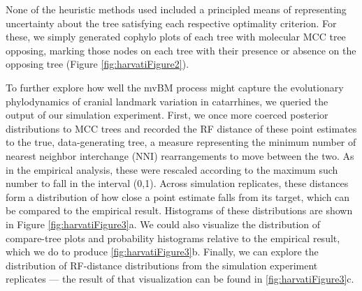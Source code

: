None of the heuristic methods used included a principled means of representing uncertainty about the tree satisfying each respective optimality criterion. For these, we simply generated cophylo plots of each tree with molecular MCC tree opposing, marking those nodes on each tree with their presence or absence on the opposing tree (Figure \ref{fig:harvatiFigure2}). 




To further explore how well the mvBM process might capture the evolutionary phylodynamics of cranial landmark variation in catarrhines, we queried the output of our simulation experiment. First, we once more coerced posterior distributions to MCC trees and recorded the RF distance of these point estimates to the true, data-generating tree, a measure representing the minimum number of nearest neighbor interchange (NNI) rearrangements to move between the two. As in the empirical analysis, these were rescaled according to the maximum such number to fall in the interval (0,1). Across simulation replicates, these distances form a distribution of how close a point estimate falls from its target, which can be compared to the empirical result. Histograms of these distributions are shown in Figure \ref{fig:harvatiFigure3}a. We could also visualize the distribution of compare-tree plots and probability histograms relative to the empirical result, which we do to produce \ref{fig:harvatiFigure3}b. Finally, we can explore the distribution of RF-distance distributions from the simulation experiment replicates --- the result of that visualization can be found in \ref{fig:harvatiFigure3}c. 

